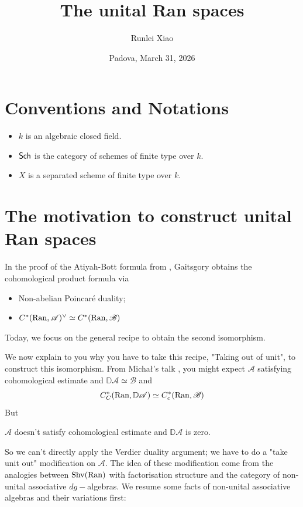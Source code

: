 \documentclass[oneside]{amsart}
\title{The unital Ran spaces}
\author{Runlei Xiao}
\date{Padova, March 31, 2026}
\begin{document}
\maketitle

\setcounter{section}{0}
\section{Conventions and Notations}
\begin{itemize}
    \item $k$ is an algebraic closed field.
    \item $\mathsf{Sch}$ is the category of schemes of finite type over $k$.
    \item $X$ is a separated scheme of finite type over $k$.
\end{itemize}

\section{The motivation to construct unital Ran spaces}

In the proof of the Atiyah-Bott formula from \cite{abott}, Gaitsgory obtains the cohomological product formula via
\begin{itemize}
    \item Non-abelian Poincaré duality;
    \item $C^*(\operatorname{Ran}, \mathscr A)^\vee \simeq C^*(\operatorname{Ran}, \mathscr{B})$
\end{itemize}
Today, we  focus on the general recipe to obtain the second isomorphism.

We now explain to you why you have to take this recipe, "Taking out of unit", to construct this isomorphism. From Micha\l's talk \cite[Theorem~1.3]{}\space, you might expect $\mathcal A$ satisfying cohomological estimate and $\mathbb{D}  \mathcal A \simeq \mathcal B$ and \[    
C^*_C(\operatorname{Ran}, \mathbb{D} \mathscr{A}) \simeq C^*_c(\operatorname{Ran}, \mathscr{B})
\]
But 
\begin{proposition}
    $\mathcal{A}$ doesn't satisfy cohomological estimate and $\mathbb{D} \mathcal A$ is zero.
\end{proposition}

So we can't directly apply the Verdier duality argument; we have to do a "take unit out" modification on $\mathcal A$. The idea of these modification come from the analogies between $\operatorname{Shv}(\operatorname{Ran})$ with factorisation structure and the category of non-unital associative $dg-$algebras. We resume some facts of non-unital associative algebras and their variations first:
\end{document}
